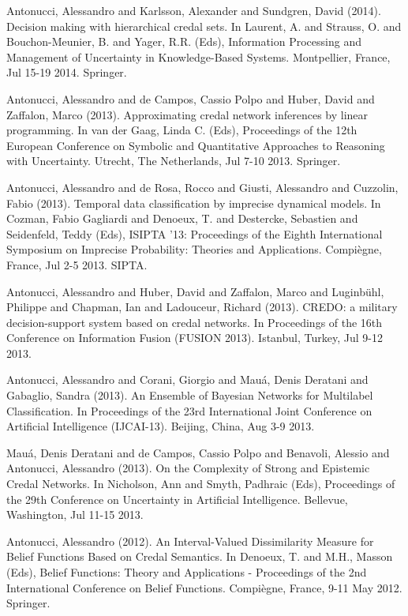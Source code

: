 \begin{cventries}
\begin{cvitems}
\item Antonucci, Alessandro and Karlsson, Alexander and Sundgren, David (2014).   Decision making with hierarchical credal sets.   In Laurent, A. and Strauss, O. and Bouchon-Meunier, B. and Yager, R.R. (Eds), Information Processing and Management of Uncertainty in Knowledge-Based Systems.   Montpellier, France,   Jul 15-19 2014.   Springer.
\item Antonucci, Alessandro and de Campos, Cassio Polpo and Huber, David and Zaffalon, Marco (2013).   Approximating credal network inferences by linear programming.   In van der Gaag, Linda C. (Eds), Proceedings of the 12th European Conference on Symbolic and Quantitative Approaches to Reasoning with Uncertainty.   Utrecht, The Netherlands,   Jul 7-10 2013.   Springer.
\item Antonucci, Alessandro and de Rosa, Rocco and Giusti, Alessandro and Cuzzolin, Fabio (2013).   Temporal data classification by imprecise dynamical models.   In Cozman, Fabio Gagliardi and Denoeux, T. and Destercke, Sebastien and Seidenfeld, Teddy (Eds), ISIPTA ’13: Proceedings of the Eighth International Symposium on Imprecise Probability: Theories and Applications.   Compiègne, France,   Jul 2-5 2013.   SIPTA.
\item Antonucci, Alessandro and Huber, David and Zaffalon, Marco and Luginbühl, Philippe and Chapman, Ian and Ladouceur, Richard (2013).   CREDO: a military decision-support system based on credal networks.   In Proceedings of the 16th Conference on Information Fusion (FUSION 2013).   Istanbul, Turkey,   Jul 9-12 2013.
\item Antonucci, Alessandro and Corani, Giorgio and Mauá, Denis Deratani and Gabaglio, Sandra (2013).   An Ensemble of Bayesian Networks for Multilabel Classification.   In Proceedings of the 23rd International Joint Conference on Artificial Intelligence (IJCAI-13).   Beijing, China,   Aug 3-9 2013.
\item Mauá, Denis Deratani and de Campos, Cassio Polpo and Benavoli, Alessio and Antonucci, Alessandro (2013).   On the Complexity of Strong and Epistemic Credal Networks.   In Nicholson, Ann and Smyth, Padhraic (Eds), Proceedings of the 29th Conference on Uncertainty in Artificial Intelligence.   Bellevue, Washington,   Jul 11-15 2013.
\item Antonucci, Alessandro (2012).   An Interval-Valued Dissimilarity Measure for Belief Functions Based on Credal Semantics.   In Denoeux, T. and M.H., Masson (Eds), Belief Functions: Theory and Applications - Proceedings of the 2nd International Conference on Belief Functions.   Compiègne, France,   9-11 May 2012.   Springer.

\end{cvitems}
\end{cventries}
